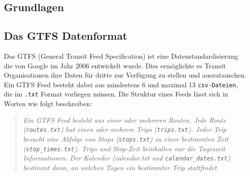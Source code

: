 
\begin{newpage}
	
	\section{Grundlagen}
	\label{sec:Grundlagen}

	\subsection{Das GTFS Datenformat}
	\label{ssec:das_gtfs_datenformat}
		Das GTFS (General Transit Feed Specification) ist eine Datenstandardisierung die von Google im Jahr 2006 entwickelt wurde. Dies ermöglichte es Transit Organisationen ihre Daten für dritte zur Verfügung zu stellen und auszutauschen. Ein GTFS Feed besteht dabei aus mindestens 6 und maximal 13 \texttt{csv-Dateien}, die im \texttt{.txt} Format vorliegen müssen. Die Struktur eines Feeds lässt sich in Worten wie folgt beschreiben:

    \begin{quote}
      \textit{Ein GTFS Feed besteht aus einer oder mehreren Routen. Jede Route (\texttt{routes.txt}) hat einen oder mehrere Trips (\texttt{trips.txt}). Jeder Trip besucht eine Abfolge von Stops (\texttt{stops.txt}) zu einer bestimmten Zeit (\texttt{stop\_times.txt}). Trips und Stop-Zeit beinhalten nur die Tageszeit Informationen. Der Kalender (calendar.txt und \texttt{calendar\_dates.txt}) bestimmt dann, an welchen Tagen ein bestimmter Trip stattfindet.} \parencite[S. 8]{zervaas}
    \end{quote}




\end{newpage}

